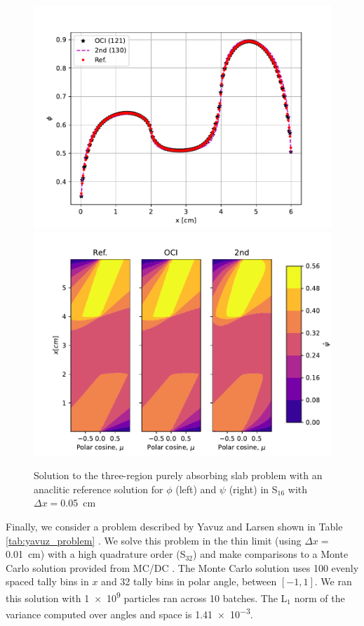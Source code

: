 \begin{figure}
    \centering
    \includegraphics[width=.75\linewidth]{figures/smm_paper/slab_abs_sf.pdf}
    \includegraphics[width=.75\linewidth]{figures/smm_paper/slab_abs_af.pdf}
    \caption{Solution to the three-region purely absorbing slab problem with an anaclitic reference solution for $\phi$ (left) and $\psi$ (right) in S$_{16}$ with $\Delta x =$\SI{0.05}{\centi\meter}}
    \label{fig:absorbium}
\end{figure}

Finally, we consider a problem described by Yavuz and Larsen shown in Table \ref{tab:yavuz_problem} \cite{yavuz_spatial_1989}.
We solve this problem in the thin limit (using $\Delta x=$ \SI{0.01}{\centi\meter}) with a high quadrature order (S$_{32}$) and make comparisons to a Monte Carlo solution provided from MC/DC \cite{morgan_monte_2024}.
The Monte Carlo solution uses 100 evenly spaced tally bins in $x$ and 32 tally bins in polar angle, between $[-1, 1]$.
We ran this solution with \num{1e9} particles ran across 10 batches.
The L$_1$ norm of the variance computed over angles and space is \num{1.41e-3}.

